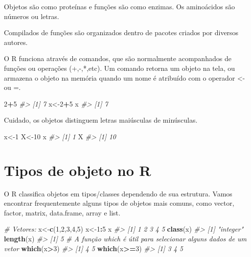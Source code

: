\documentclass[
]{book}
\newenvironment{Shaded}{\begin{snugshade}}{\end{snugshade}}
\newcommand{\CommentTok}[1]{\textcolor[rgb]{0.56,0.35,0.01}{\textit{#1}}}
\newcommand{\DecValTok}[1]{\textcolor[rgb]{0.00,0.00,0.81}{#1}}
\newcommand{\FunctionTok}[1]{\textcolor[rgb]{0.13,0.29,0.53}{\textbf{#1}}}
\newcommand{\NormalTok}[1]{#1}
\newcommand{\OtherTok}[1]{\textcolor[rgb]{0.56,0.35,0.01}{#1}}
\newcommand{\SpecialCharTok}[1]{\textcolor[rgb]{0.81,0.36,0.00}{\textbf{#1}}}
\begin{document}
Objetos são como proteínas e funções são como enzimas.
Os aminoácidos são números ou letras.

Compilados de funções são organizados dentro de pacotes criados por diversos autores.

O R funciona através de comandos, que são normalmente acompanhados de funções ou operações (+,-,*,etc).
Um comando retorna um objeto na tela, ou armazena o objeto na memória quando um nome é atribuído com o operador \textless- ou =.

\begin{Shaded}
\begin{Highlighting}[]
\DecValTok{2}\SpecialCharTok{+}\DecValTok{5}
\CommentTok{\#\textgreater{} [1] 7}
\NormalTok{x}\OtherTok{\textless{}{-}}\DecValTok{2}\SpecialCharTok{+}\DecValTok{5}
\NormalTok{x}
\CommentTok{\#\textgreater{} [1] 7}
\end{Highlighting}
\end{Shaded}

Cuidado, os objetos distinguem letras maiúsculas de minúsculas.

\begin{Shaded}
\begin{Highlighting}[]
\NormalTok{x}\OtherTok{\textless{}{-}}\DecValTok{1}
\NormalTok{X}\OtherTok{\textless{}{-}}\DecValTok{10}
\NormalTok{x}
\CommentTok{\#\textgreater{} [1] 1}
\NormalTok{X}
\CommentTok{\#\textgreater{} [1] 10}
\end{Highlighting}
\end{Shaded}

\section{Tipos de objeto no R}\label{tipos-de-objeto-no-r}

O R classifica objetos em tipos/classes dependendo de sua estrutura.
Vamos encontrar frequentemente alguns tipos de objetos mais comuns, como vector, factor, matrix, data.frame, array e list.

\begin{Shaded}
\begin{Highlighting}[]
\CommentTok{\# Vetores:}
\NormalTok{x}\OtherTok{\textless{}{-}}\FunctionTok{c}\NormalTok{(}\DecValTok{1}\NormalTok{,}\DecValTok{2}\NormalTok{,}\DecValTok{3}\NormalTok{,}\DecValTok{4}\NormalTok{,}\DecValTok{5}\NormalTok{)}
\NormalTok{x}\OtherTok{\textless{}{-}}\DecValTok{1}\SpecialCharTok{:}\DecValTok{5}
\NormalTok{x}
\CommentTok{\#\textgreater{} [1] 1 2 3 4 5}
\FunctionTok{class}\NormalTok{(x)}
\CommentTok{\#\textgreater{} [1] "integer"}
\FunctionTok{length}\NormalTok{(x)}
\CommentTok{\#\textgreater{} [1] 5}
\CommentTok{\# A função which é útil para selecionar alguns dados de um vetor}
\FunctionTok{which}\NormalTok{(x}\SpecialCharTok{\textgreater{}}\DecValTok{3}\NormalTok{)}
\CommentTok{\#\textgreater{} [1] 4 5}
\FunctionTok{which}\NormalTok{(x}\SpecialCharTok{\textgreater{}=}\DecValTok{3}\NormalTok{)}
\CommentTok{\#\textgreater{} [1] 3 4 5}
\end{Highlighting}
\end{Shaded}
\end{document}
